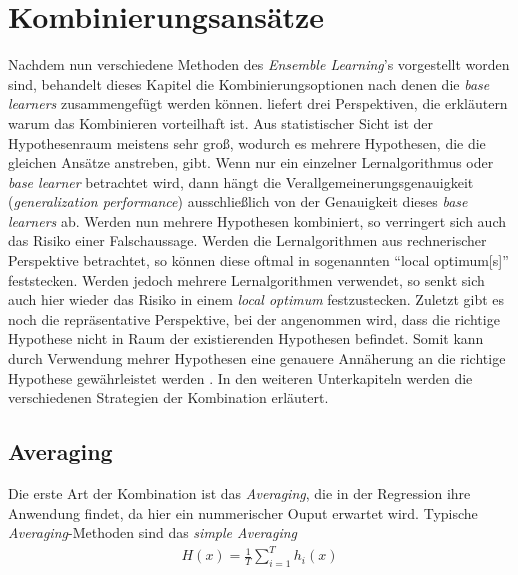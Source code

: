 \section{Kombinierungsansätze}
Nachdem nun verschiedene Methoden des \textit{Ensemble Learning}'s vorgestellt worden sind, behandelt dieses Kapitel die Kombinierungsoptionen nach denen die \textit{base learners} zusammengefügt werden können. \citeauthor[]{Dietterich.}\autocite[vgl. S.3f.]{Dietterich.} liefert drei Perspektiven, die erkläutern warum das Kombinieren vorteilhaft ist. Aus statistischer Sicht ist der Hypothesenraum meistens sehr groß, wodurch es mehrere Hypothesen, die die gleichen Ansätze anstreben, gibt. Wenn nur ein einzelner Lernalgorithmus oder \textit{base learner} betrachtet wird, dann hängt die Verallgemeinerungsgenauigkeit (\textit{generalization performance}) ausschließlich von der Genauigkeit dieses \textit{base learners} ab. Werden nun mehrere Hypothesen kombiniert, so verringert sich auch das Risiko einer Falschaussage. Werden die Lernalgorithmen aus rechnerischer Perspektive betrachtet, so können diese oftmal in sogenannten \enquote{local optimum[s]}\autocite[S.193]{Zhou.2021} feststecken. Werden jedoch mehrere Lernalgorithmen verwendet, so senkt sich auch hier wieder das Risiko in einem \textit{local optimum} festzustecken. Zuletzt gibt es noch die repräsentative Perspektive, bei der angenommen wird, dass die richtige Hypothese nicht in Raum der existierenden Hypothesen befindet. Somit kann durch Verwendung mehrer Hypothesen eine genauere Annäherung an die richtige Hypothese gewährleistet werden \autocite[vgl. S.194]{Zhou.2021} \autocite[vgl. S.4]{Dietterich.}. In den weiteren Unterkapiteln werden die verschiedenen Strategien der Kombination erläutert.

\subsection{Averaging}

Die erste Art der Kombination ist das \textit{Averaging}, die in der Regression ihre Anwendung findet, da hier ein nummerischer Ouput erwartet wird. Typische \textit{Averaging}-Methoden sind das \textit{simple Averaging}
\begin{equation}
    \begin{gathered}
        H(x) = \frac{1}{T}\sum_{i=1}^{T}h_{i}(x)
    \end{gathered}
    \label{eq:simpleAveraging}
\end{equation}

